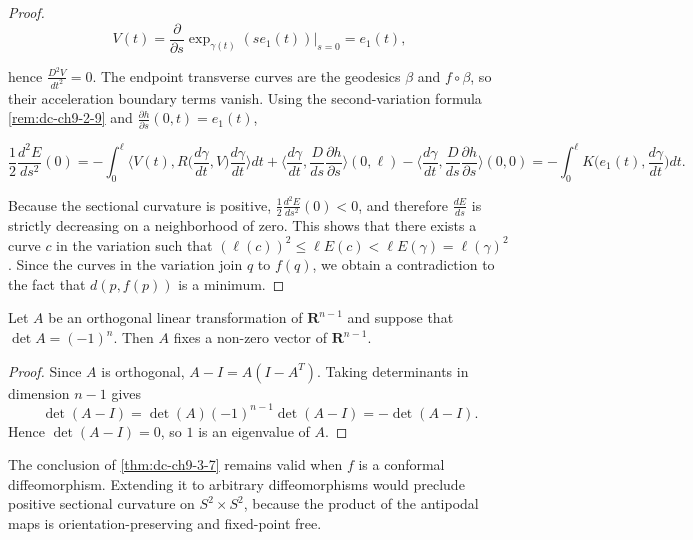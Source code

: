 \begin{proof}
  $$
  V(t)=\frac{\partial}{\partial s}\exp_{\gamma(t)}(se_1(t))\Big|_{s=0}=e_1(t),
  $$

  hence $\frac{D^2 V}{dt^2}=0$. The endpoint transverse curves are the
  geodesics $\beta$ and $f\circ\beta$, so their acceleration boundary terms vanish.
  Using the second-variation formula \cref{rem:dc-ch9-2-9} and
  $\frac{\partial h}{\partial s}(0,t)=e_1(t)$,

  $$
  \frac{1}{2}\frac{d^2 E}{ds^2}(0)=-\int_0^\ell\Big\langle V(t),R\Big(\frac{d\gamma}{dt},V\Big)\frac{d\gamma}{dt}\Big\rangle dt+\Big\langle\frac{d\gamma}{dt},\frac{D}{ds}\frac{\partial h}{\partial s}\Big\rangle(0,\ell)-\Big\langle\frac{d\gamma}{dt},\frac{D}{ds}\frac{\partial h}{\partial s}\Big\rangle(0,0)=-\int_0^\ell K\Big(e_1(t),\frac{d\gamma}{dt}\Big)dt.
  $$

  Because the sectional curvature is positive, $\frac{1}{2}\frac{d^2 E}{ds^2}(0)<0$,
  and therefore $\frac{dE}{ds}$ is strictly decreasing on a neighborhood of zero.
  This shows that there exists a curve $c$ in the variation such that
  $(\ell(c))^2\le\ell E(c)<\ell E(\gamma)=\ell(\gamma)^2$. Since the curves in the
  variation join $q$ to $f(q)$, we obtain a contradiction to the fact that
  $d(p,f(p))$ is a minimum.
\end{proof}
\begin{lemma}
  \label{lem:dc-ch9-3-8}
  \leanok
  Let $A$ be an orthogonal linear transformation of $\mathbf{R}^{n-1}$ and suppose
  that $\det A=(-1)^n$. Then $A$ fixes a non-zero vector of
  $\mathbf{R}^{n-1}$.
\end{lemma}
\begin{proof}
  \sketch
  Since $A$ is orthogonal, $A-I=A(I-A^{T})$. Taking determinants in dimension
  $n-1$ gives
  $$
  \det(A-I)=\det(A)(-1)^{n-1}\det(A-I)=-\det(A-I).
  $$
  Hence $\det(A-I)=0$, so $1$ is an eigenvalue of $A$.
\end{proof}
\begin{remark}
  \label{rem:dc-ch9-3-9}
  The conclusion of \cref{thm:dc-ch9-3-7} remains valid when $f$ is a
  conformal diffeomorphism. Extending it to arbitrary diffeomorphisms would
  preclude positive sectional curvature on $S^2\times S^2$, because the
  product of the antipodal maps is orientation-preserving and fixed-point free.
\end{remark}
